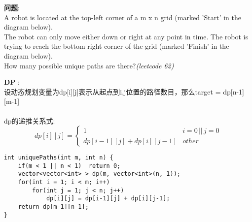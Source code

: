     
\begin{description}
    \item{\textbf{问题}}:\\
A robot is located at the top-left corner of a m x n grid (marked 'Start' in the diagram below).\\
The robot can only move either down or right at any point in time. The robot is trying to reach the bottom-right corner of the grid (marked 'Finish' in the diagram below).\\
How many possible unique paths are there?\textit{(leetcode 62)}
    \item{\textbf{DP}} : 
    \\设动态规划变量为dp[i][j]表示从起点到i,j位置的路径数目，那么target = dp[n-1][m-1]\\
	\\dp的递推关系式:
$$
dp[i][j] =
\begin{cases} 
1 & i = 0 \,||\, j = 0 \\
dp[i-1][j]+dp[i][j-1] & other
\end{cases}
$$
    \begin{lstlisting}
int uniquePaths(int m, int n) {
	if(m < 1 || n < 1)	return 0;
	vector<vector<int> > dp(m, vector<int>(n, 1));
	for(int i = 1; i < m; i++)
		for(int j = 1; j < n; j++)
			dp[i][j] = dp[i-1][j] + dp[i][j-1];
	return dp[m-1][n-1];
}
    \end{lstlisting}
\end{description}

